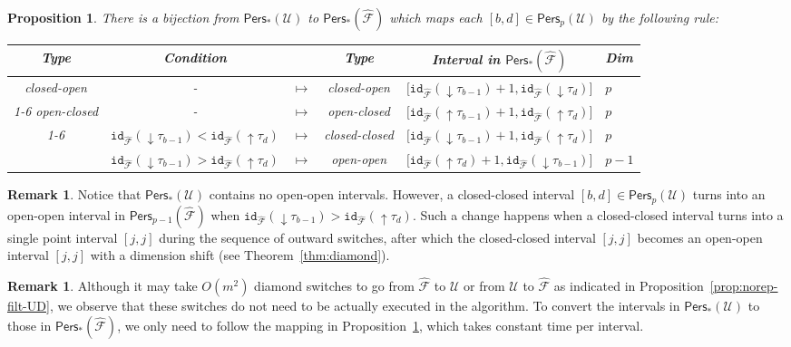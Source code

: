 \documentclass[letterpaper,11pt]{article}
\theoremstyle{mythmstyle}
\newtheorem{proposition}[theorem]{Proposition}
\theoremstyle{mydefstyle}
\newtheorem{remark}{Remark}
\theoremstyle{plain}
\newtheorem{proposition}[theorem]{Proposition}
\theoremstyle{definition}
\newtheorem{remark}[theorem]{Remark}
\newcommand{\id}{\mathtt{id}}
\newcommand{\Pers}{\mathsf{Pers}}
\newcommand{\<}[1]{\langle #1\rangle}
\newcommand{\Fcal}{\mathcal{F}}
\newcommand{\Ucal}{\mathcal{U}}
\newcommand{\Dim}{p}
\newcommand{\filtcnt}{m}
\newcommand{\Fnr}{{\hat{\Fcal}}}
\newcommand{\ud}{\Ucal}
\newcommand{\usimp}{\tau}
\newcommand{\add}[1]{{\downarrow}#1}
\newcommand{\del}[1]{{\uparrow}#1}
\begin{document}
\newcommand{\mytabfont}{\footnotesize}
\newcommand{\mytabfonttwo}{\scriptsize}
\begin{proposition}\label{prop:ud-f-map}
There is a bijection from $\Pers_*(\ud)$ to $\Pers_*(\Fnr)$
which maps each $[b,d]\in\Pers_\Dim(\ud)$
by the following rule{\rm:}
{\rm \begin{center}
\begin{tabular}{cccccl}
\midrule
Type & Condition & & Type & Interval in $\Pers_*(\Fnr)$ & Dim  \\
\midrule
{\mytabfont closed-open} & - & {\mytabfonttwo$\mapsto$} & {\mytabfont closed-open} &
  $\big[\id_\Fnr(\add{\usimp_{b-1}})+1,\id_\Fnr({\add{\usimp_d}})\big]$ &
  $\Dim$ \\ 
\cmidrule{1-6}
{\mytabfont open-closed} & - & {\mytabfonttwo$\mapsto$} & {\mytabfont open-closed} & 
  $\big[\id_\Fnr(\del{\usimp_{b-1}})+1,\id_\Fnr({\del{\usimp_d}})\big]$ &
  $\Dim$ \\ 
\cmidrule{1-6}
\multirow{2}{*}{\mytabfont closed-closed} &
  $\id_\Fnr(\add{\usimp_{b-1}})<\id_\Fnr({\del{\usimp_d}})$ &
  {\mytabfonttwo$\mapsto$} & {\mytabfont closed-closed} &
  $\big[\id_\Fnr(\add{\usimp_{b-1}})+1,\id_\Fnr({\del{\usimp_d}})\big]$ &
  $\Dim$ \\
& $\id_\Fnr(\add{\usimp_{b-1}})>\id_\Fnr({\del{\usimp_d}})$ &
  {\mytabfonttwo$\mapsto$} & {\mytabfont open-open} &
  $\big[\id_\Fnr({\del{\usimp_d}})+1,\id_\Fnr(\add{\usimp_{b-1}})\big]$ &
  $\Dim{-}1$ \\
\midrule
\end{tabular}
\end{center}}
\end{proposition}
\begin{remark}
Notice that $\Pers_*(\ud)$ contains no open-open intervals. 
However, a closed-closed interval $[b,d]\in\Pers_\Dim(\ud)$ turns into an open-open
interval in $\Pers_{\Dim-1}(\Fnr)$ when $\id_\Fnr(\add{\usimp_{b-1}})>\id_\Fnr({\del{\usimp_d}})$.
Such a change
happens 
when a closed-closed interval
turns into a single point interval $[j,j]$ 
during the sequence of outward switches,
after which
the closed-closed interval $[j,j]$ becomes an open-open interval
$[j,j]$ with a dimension shift (see Theorem~\ref{thm:diamond}).
\end{remark}
\begin{remark}
Although it may take $O(\filtcnt^2)$ diamond switches to go from $\Fnr$ to $\ud$
or from $\ud$ to $\Fnr$ as indicated in Proposition~\ref{prop:norep-filt-UD}, 
we observe that these switches 
do not need to be actually executed 
in the algorithm. 
To convert the intervals in $\Pers_*(\ud)$ to those in $\Pers_*(\Fnr)$,
we only need to follow the mapping in Proposition~\ref{prop:ud-f-map},
which takes constant time per interval.
\end{remark}
\end{document}
